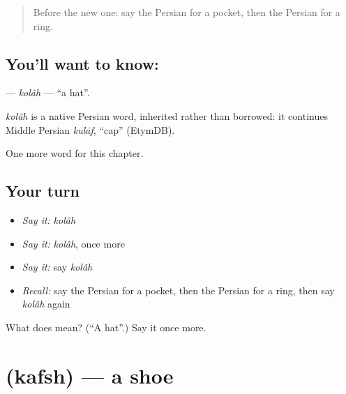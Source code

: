 \label{lesson:FA-C74-kolah}



\begin{quote}
Before the new one: say the Persian for a pocket, then the Persian for a ring.
\end{quote}

\subsection*{You'll want to know: }
\textbf{} — \emph{kolâh} — \textquotedblleft{}a hat\textquotedblright{}.

\begin{cousinweb}
\emph{kolâh} is a native Persian word, inherited rather than borrowed: it continues Middle Persian \emph{kulāf}, \textquotedblleft{}cap\textquotedblright{} (EtymDB).
\end{cousinweb}

\begin{grammarlens}[title={What you've built}]
One more word for this chapter.
\end{grammarlens}

\subsection*{Your turn}
\begin{itemize}
\raggedright
  \item \emph{Say it:} \emph{kolâh}
  \item \emph{Say it:} \emph{kolâh}, once more
  \item \emph{Say it:} say \emph{kolâh}
  \item \emph{Recall:} say the Persian for a pocket, then the Persian for a ring, then say \emph{kolâh} again
\end{itemize}

\begin{tcolorbox}[breakable,colback=teal!4,colframe=teal!35!black,title={Before you move on}]
What does  mean? (\textquotedblleft{}A hat\textquotedblright{}.) Say it once more.
\end{tcolorbox}
\section[\texorpdfstring{\fa{کفش} (kafsh)}{کفش (kafsh)}]{ (kafsh) — a shoe}

\label{lesson:FA-C74-kafsh}



